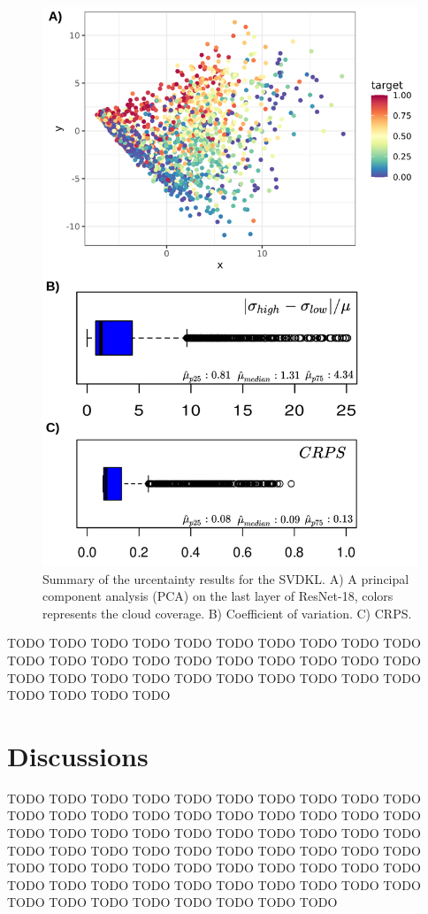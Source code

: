 \documentclass[a4paper, nobind]{templates/cdethesis}
\begin{document}
\begin{figure}[!h]
    \centering
    \includegraphics[width=0.75\linewidth]{figures/chapter02/figure07.png}
    \caption{Summary of the urcentainty results for the SVDKL. A) A principal component analysis (PCA) 
    on the last layer of ResNet-18, colors represents the cloud coverage. B) Coefficient of variation. C)     CRPS.}
    \label{fig:figurexy02}
\end{figure}

TODO TODO TODO TODO TODO TODO TODO TODO TODO TODO TODO TODO TODO TODO TODO TODO TODO TODO TODO TODO TODO TODO TODO TODO TODO TODO TODO TODO TODO TODO TODO TODO TODO TODO

\hypertarget{discussions}{%
\section{Discussions}\label{discussions}}

TODO TODO TODO TODO TODO TODO TODO TODO TODO TODO TODO TODO TODO TODO TODO TODO TODO TODO TODO TODO TODO TODO TODO TODO TODO TODO TODO TODO TODO TODO TODO TODO TODO TODO
TODO TODO TODO TODO TODO TODO TODO TODO TODO TODO TODO TODO TODO TODO TODO TODO TODO TODO TODO TODO TODO TODO TODO TODO TODO TODO TODO TODO TODO TODO TODO TODO TODO TODO
\end{document}
